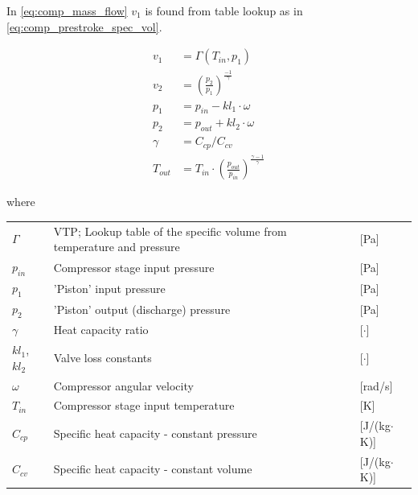 In \cref{eq:comp_mass_flow} $v_1$ is found from table lookup as in \cref{eq:comp_prestroke_spec_vol}.

\begin{align}
	v_1 &= \Gamma(T_{in},p_{1}) \label{eq:comp_prestroke_spec_vol} \\
	v_2 &= \left(\frac{p_2}{p_1}\right)^{\frac{-1}{\gamma}} \\
	p_1 &= p_{in} - kl_1 \cdot \omega \\
	p_2 &= p_{out} + kl_2 \cdot \omega \\
	\gamma &= C_{cp}/C_{cv} \\
	T_{out} &= T_{in}\cdot \left(\frac{p_{out}}{p_{in}}\right)^{\frac{\gamma-1}{\gamma}}
\end{align}

where

\begin{center}
	\begin{tabular}{l p{8cm} l}
		$\Gamma$        & VTP; Lookup table of the specific volume from temperature and pressure & [\si{Pa}]                         \\
		$p_{in}$        & Compressor stage input pressure                                        & [\si{Pa}]                         \\
		$p_1$           & 'Piston' input pressure                                                  & [\si{Pa}]                         \\
		$p_2$           & 'Piston' output (discharge) pressure                                     & [\si{Pa}]                         \\
		$\gamma$        & Heat capacity ratio                                                    & [$ \cdot $]                       \\
		$ kl_1$, $kl_2$ & Valve loss constants                                                   & [$ \cdot $]                       \\
		$\omega$        & Compressor angular velocity                                            & [\si{rad}/\si{s}]                 \\
		$T_{in}$        & Compressor stage input temperature                                     & [\si{K}]                          \\
		$C_{cp}$        & Specific heat capacity - constant pressure                             & [\si{J}/(\si{kg}$ \cdot $\si{K})] \\
		$C_{cv} $       & Specific heat capacity - constant volume                               & [\si{J}/(\si{kg}$ \cdot $\si{K})]
	\end{tabular}
\end{center}


